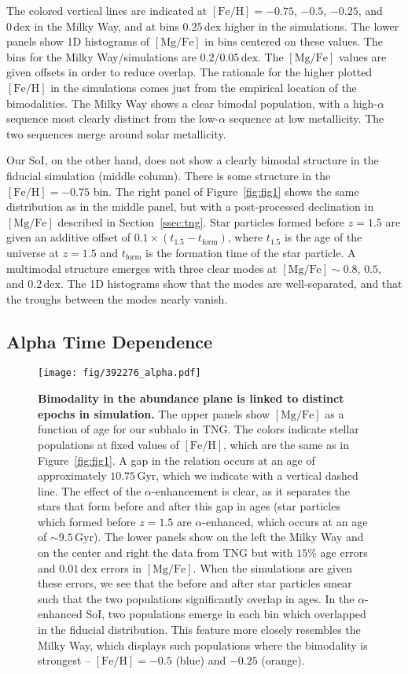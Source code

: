 \documentclass[linenumbers, twocolumn]{aastex631}
\newcommand{\Gyr}{\ensuremath{\textrm{Gyr}}}
\newcommand{\FeH}{\ensuremath{[\textrm{Fe}/\textrm{H}]}}
\newcommand{\MgFe}{\ensuremath{[\textrm{Mg}/\textrm{Fe}]}}
\newcommand{\dex}{\ensuremath{\textrm{dex}}}
\begin{document}
The colored vertical lines are indicated at $\FeH=-0.75$, $-0.5$, $-0.25$, and $0\,\dex$ in the Milky Way, and at bins $0.25\,\dex$ higher in the simulations. The lower panels show 1D histograms of \MgFe{} in bins centered on these values. The bins for the Milky Way/simulations are $0.2$/$0.05\,\dex$. The \MgFe{} values are given offsets in order to reduce overlap. The rationale for the higher plotted \FeH{} in the simulations comes just from the empirical location of the bimodalities. The Milky Way shows a clear bimodal population, with a high-$\alpha$ sequence most clearly distinct from the low-$\alpha$ sequence at low metallicity. The two sequences merge around solar metallicity.

Our SoI, on the other hand, does not show a clearly bimodal structure in the fiducial simulation (middle column). There is some structure in the $\FeH=-0.75$ bin. The right panel of Figure~\ref{fig:fig1} shows the same distribution as in the middle panel, but with a post-processed declination in \MgFe{} described in Section~\ref{ssec:tng}. Star particles formed before $z=1.5$ are given an additive offset of $0.1\times\left(t_{1.5}-t_{\textrm{form}}\right)$, where $t_{1.5}$ is the age of the universe at $z=1.5$ and $t_{\textrm{form}}$ is the formation time of the star particle. A multimodal structure emerges with three clear modes at $\MgFe\sim0.8$, $0.5$, and $0.2\,\dex$. The 1D histograms show that the modes are well-separated, and that the troughs between the modes nearly vanish.

\subsection{Alpha Time Dependence}\label{ssec:alpha_time}

\begin{figure*}
  \centering
  \texttt{[image: fig/392276\_alpha.pdf]}
  \caption{\textbf{Bimodality in the abundance plane is linked to distinct epochs in simulation.} The upper panels show \MgFe{} as a function of age for our subhalo in TNG. The colors indicate stellar populations at fixed values of \FeH{}, which are the same as in Figure~\ref{fig:fig1}. A gap in the relation occurs at an age of approximately $10.75\,\Gyr$, which we indicate with a vertical dashed line. The effect of the $\alpha$-enhancement is clear, as it separates the stars that form before and after this gap in ages (star particles which formed before $z=1.5$ are $\alpha$-enhanced, which occurs at an age of $\sim9.5\,\Gyr$). The lower panels show on the left the Milky Way and on the center and right the data from TNG but with $15\%$ age errors and $0.01\,\dex$ errors in \MgFe{}. When the simulations are given these errors, we see that the before and after star particles smear such that the two populations significantly overlap in ages. In the $\alpha$-enhanced SoI, two populations emerge in each bin which overlapped in the fiducial distribution. This feature more closely resembles the Milky Way, which displays such populations where the bimodality is strongest -- $\FeH=-0.5$ (blue) and $-0.25$ (orange).}
  \label{fig:alpha}
\end{figure*}
\end{document}
